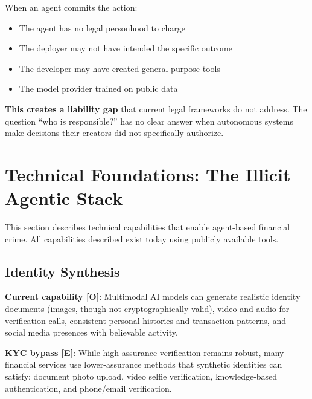 \documentclass[11pt,letterpaper]{article}
\begin{document}
When an agent commits the action:
\begin{itemize}
  \item The agent has no legal personhood to charge
  \item The deployer may not have intended the specific outcome
  \item The developer may have created general-purpose tools
  \item The model provider trained on public data
\end{itemize}

\textbf{This creates a liability gap} that current legal frameworks do not address. The question ``who is responsible?'' has no clear answer when autonomous systems make decisions their creators did not specifically authorize.

\section{Technical Foundations: The Illicit Agentic Stack}

This section describes technical capabilities that enable agent-based financial crime. All capabilities described exist today using publicly available tools.

\subsection{Identity Synthesis}

\textbf{Current capability [O]}: Multimodal AI models can generate realistic identity documents (images, though not cryptographically valid), video and audio for verification calls, consistent personal histories and transaction patterns, and social media presences with believable activity.

\textbf{KYC bypass [E]}: While high-assurance verification remains robust, many financial services use lower-assurance methods that synthetic identities can satisfy: document photo upload, video selfie verification, knowledge-based authentication, and phone/email verification.
\end{document}
